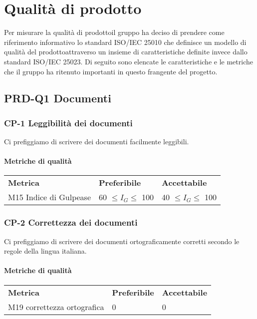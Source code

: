 \section{Qualità di prodotto}
    Per misurare la qualità di prodotto\glosp il gruppo ha deciso di prendere come riferimento informativo lo standard ISO/IEC 25010 che definisce un modello di qualità del prodotto\glosp attraverso un insieme di caratteristiche definite invece dallo standard ISO/IEC 25023. Di seguito sono elencate le caratteristiche e le metriche che il gruppo ha ritenuto importanti in questo frangente del progetto\glo.
    \subsection{PRD-Q1 Documenti}
    	\subsubsection{CP-1 Leggibilità dei documenti}
    		Ci prefiggiamo di scrivere dei documenti facilmente leggibili.
	    \paragraph{Metriche di qualità}
	    \begin{longtable} {
	    		>{}p{80mm} 
	    		>{}p{25mm}
	    		>{}p{25mm}
	    	}
	    	\rowcolor{gray!50}
	    	\textbf{Metrica} & \textbf{Preferibile} & \textbf{Accettabile} \TBstrut \TBstrut \\
	    	M15 Indice di Gulpease & 60 $\le I_{G} \le$ 100 & 40 $\le I_{G} \le$ 100 \TBstrut \\ [2mm]
	    \end{longtable}
    	\subsubsection{CP-2 Correttezza dei documenti}
    		Ci prefiggiamo di scrivere dei documenti ortograficamente corretti secondo le regole della lingua italiana.
    	\paragraph{Metriche di qualità}
    	\begin{longtable} {
    			>{}p{80mm} 
    			>{}p{25mm}
    			>{}p{25mm}
    		}
    		\rowcolor{gray!50}
    		\textbf{Metrica} & \textbf{Preferibile} & \textbf{Accettabile} \TBstrut \TBstrut \\
    		M19 correttezza ortografica & 0 & 0 \TBstrut \\ [2mm]
    	\end{longtable}
    	

